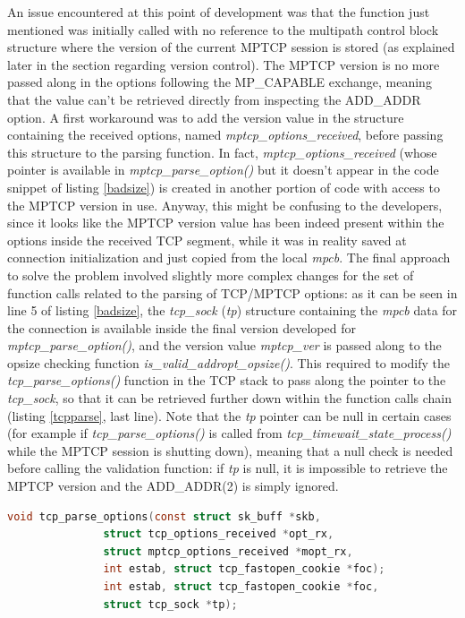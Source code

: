 An issue encountered at this point of development was that the function just mentioned was initially called with no reference to the multipath control block structure where the version of the current MPTCP session is stored (as explained later in the section regarding version control). The MPTCP version is no more passed along in the options following the MP\_CAPABLE exchange, meaning that the value can't be retrieved directly from inspecting the ADD\_ADDR option. A first workaround was to add the version value in the structure containing the received options, named \textit{mptcp\_options\_received}, before passing this structure to the parsing function. In fact, \textit{mptcp\_options\_received} (whose pointer is available in \textit{mptcp\_parse\_option()} but it doesn't appear in the code snippet of listing \ref{badsize}) is created in another portion of code with access to the MPTCP version in use. Anyway, this might be confusing to the developers, since it looks like the MPTCP version value has been indeed present within the options inside the received TCP segment, while it was in reality saved at connection initialization and just copied from the local \textit{mpcb}. The final approach to solve the problem involved slightly more complex changes for the set of function calls related to the parsing of TCP/MPTCP options: as it can be seen in line 5 of listing \ref{badsize}, the \textit{tcp\_sock} (\textit{tp}) structure containing the \textit{mpcb} data for the connection is available inside the final version developed for \textit{mptcp\_parse\_option()}, and the version value \textit{mptcp\_ver} is passed along to the opsize checking function \textit{is\_valid\_addropt\_opsize()}. This required to modify the \textit{tcp\_parse\_options()} function in the TCP stack to pass along the pointer to the \textit{tcp\_sock}, so that it can be retrieved further down within the function calls chain (listing \ref{tcpparse}, last line). Note that the \textit{tp} pointer can be null in certain cases (for example if \textit{tcp\_parse\_options()} is called from \textit{tcp\_timewait\_state\_process()} while the MPTCP session is shutting down), meaning that a null check is needed before calling the validation function: if \textit{tp} is null, it is impossible to retrieve the MPTCP version and the ADD\_ADDR(2) is simply ignored.

\begin{lstlisting}[language=c, caption=\textit{New definition for \textit{tcp\_parse\_options}}, label=tcpparse]
void tcp_parse_options(const struct sk_buff *skb,
 		       struct tcp_options_received *opt_rx,
 		       struct mptcp_options_received *mopt_rx,
		       int estab, struct tcp_fastopen_cookie *foc);
		       int estab, struct tcp_fastopen_cookie *foc,
		       struct tcp_sock *tp);
\end{lstlisting}

